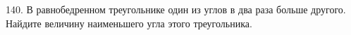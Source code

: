 140. В равнобедренном треугольнике один из углов в два раза больше другого. Найдите величину наименьшего угла этого треугольника.\\

